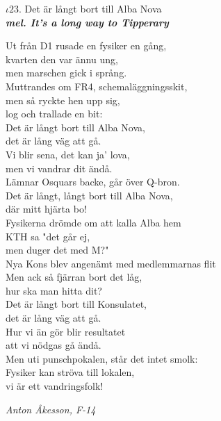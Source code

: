 \documentclass[a6paper,10pt]{article}
\newcommand{\mel}[1]{\small\textbf{\textit{mel. #1 \\}}}
\begin{document}
\setlength{\oddsidemargin}{-0.37in}
\noindent
\begin{center}
\Large $\iota23$. Det är långt bort till Alba Nova\\
\mel{It's a long way to Tipperary}
\end{center}
Ut från D1 rusade en fysiker en gång, \\
kvarten den var ännu ung, \\ men marschen gick i språng. \\
Muttrandes om FR4, schemaläggningsskit, \\
men så ryckte hen upp sig,  \\log och trallade en bit:
\vspace{5pt} \\
Det är långt bort till Alba Nova, \\
det är lång väg att gå. \\
Vi blir sena, det kan ja’ lova, \\ 
men vi vandrar dit ändå. \\
Lämnar Osquars backe, går över Q-bron. \\
Det är långt, långt bort till Alba Nova, \\
där mitt hjärta bo!
\vspace{5pt} \\
Fysikerna drömde om att kalla Alba hem \\
KTH sa "det går ej, \\ men duger det med M?" \\
Nya Kons blev angenämt med medlemmarnas flit \\
Men ack så fjärran bort det låg, \\ hur ska man hitta dit?
\vspace{5pt} \\
Det är långt bort till Konsulatet, \\
det är lång väg att gå. \\
Hur vi än gör blir resultatet \\
att vi nödgas gå ändå. \\
Men uti punschpokalen, står det intet smolk: \\
Fysiker kan ströva till lokalen, \\
vi är ett vandringsfolk!
\begin{flushright}
\textit{Anton Åkesson, F-14}
\end{flushright}
\end{document}
